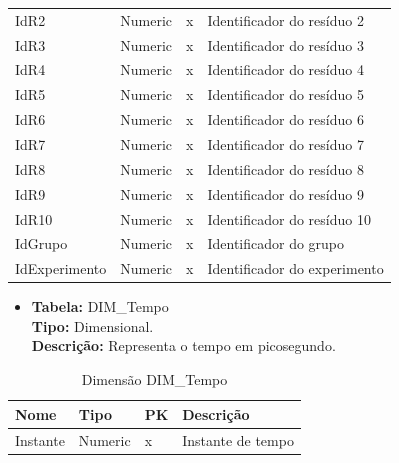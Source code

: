 \begin{table}[!htbp]
\begin{tabular}{@{}llll@{}}
	IdR2 				     & Numeric        &  x          & Identificador do resíduo 2   	\\
	IdR3 				     & Numeric        &  x          & Identificador do resíduo 3   	\\
	IdR4 				     & Numeric        &  x          & Identificador do resíduo 4   	\\
	IdR5 				     & Numeric        &  x          & Identificador do resíduo 5   	\\
	IdR6 				     & Numeric        &  x          & Identificador do resíduo 6   	\\
	IdR7 				     & Numeric        &  x          & Identificador do resíduo 7   	\\
	IdR8 				     & Numeric        &  x          & Identificador do resíduo 8   	\\
	IdR9 				     & Numeric        &  x          & Identificador do resíduo 9   	\\
	IdR10			 	     & Numeric        &  x          & Identificador do resíduo 10  	\\	
	IdGrupo			 	     & Numeric        &  x          & Identificador do grupo  		\\	
	IdExperimento 			 & Numeric        &  x          & Identificador do experimento 	\\ \bottomrule
	\end{tabular}
\end{table}

\begin{itemize}
	\item
		\textbf{Tabela:} DIM\_Tempo \\
		\textbf{Tipo:} Dimensional. \\
		\textbf{Descrição:} Representa o tempo em picosegundo. \\
\end{itemize}
\begin{table}[h]
	\caption{Dimensão DIM\_Tempo}
	\centering
	\begin{tabular}{@{}llll@{}}
	\toprule
	\textbf{Nome} 	& \textbf{Tipo} & \textbf{PK} & \textbf{Descrição}           		\\ \midrule			
	Instante 		& Numeric 	       &  x           & Instante de tempo 					\\ \bottomrule
	\end{tabular}
\end{table}

